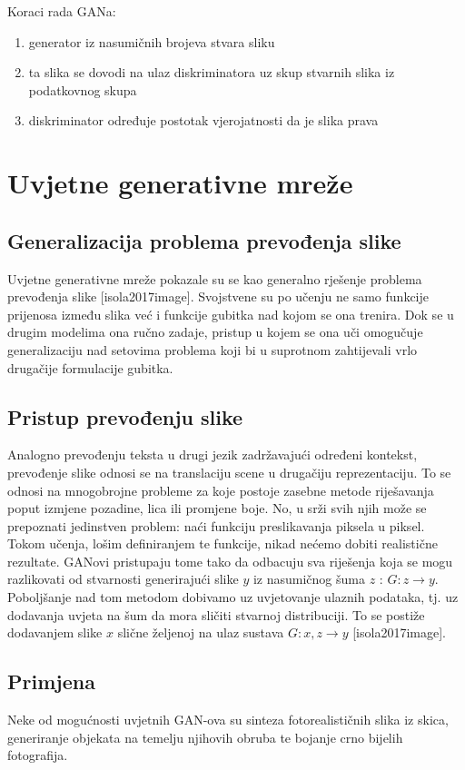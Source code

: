\documentclass[lmodern, utf8, seminar]{fer}
\begin{document}
Koraci rada GANa:
\begin{enumerate} 
\item generator iz nasumičnih brojeva stvara sliku
\item ta slika se dovodi na ulaz diskriminatora uz skup stvarnih slika iz podatkovnog skupa
\item diskriminator određuje postotak vjerojatnosti da je slika prava
\end{enumerate}



\chapter{Uvjetne generativne mreže}
\section{Generalizacija problema prevođenja slike}
Uvjetne generativne mreže pokazale su se kao generalno rješenje problema prevođenja slike [isola2017image]. Svojstvene su po učenju ne samo funkcije prijenosa između slika već i funkcije gubitka nad kojom se ona trenira.
Dok se u drugim modelima ona ručno zadaje, pristup u kojem se ona uči omogučuje generalizaciju nad setovima problema koji bi u suprotnom zahtijevali vrlo drugačije formulacije gubitka.
\newline

\section{Pristup prevođenju slike}
Analogno prevođenju teksta u drugi jezik zadržavajući određeni kontekst, prevođenje slike odnosi se na translaciju scene u drugačiju reprezentaciju. To se odnosi na mnogobrojne probleme za koje postoje zasebne metode riješavanja poput izmjene pozadine, lica ili promjene boje. No, u srži svih njih može se prepoznati jedinstven problem: naći funkciju preslikavanja piksela u piksel. Tokom učenja, lošim definiranjem te funkcije, nikad nećemo dobiti realistične rezultate. GANovi pristupaju tome tako da odbacuju sva riješenja koja se mogu razlikovati od stvarnosti generirajući slike $y$ iz nasumičnog šuma $z$ : $G: z \rightarrow y$. Poboljšanje nad tom metodom dobivamo uz uvjetovanje ulaznih podataka, tj. uz dodavanja uvjeta na šum da mora sličiti stvarnoj distribuciji. To se postiže dodavanjem slike $x$ slične željenoj na ulaz sustava $G: {x,z} \rightarrow y$ [isola2017image].

\section{Primjena}
Neke od mogućnosti uvjetnih GAN-ova su sinteza fotorealističnih slika iz skica, generiranje objekata na temelju njihovih obruba te bojanje crno bijelih fotografija.
\end{document}
